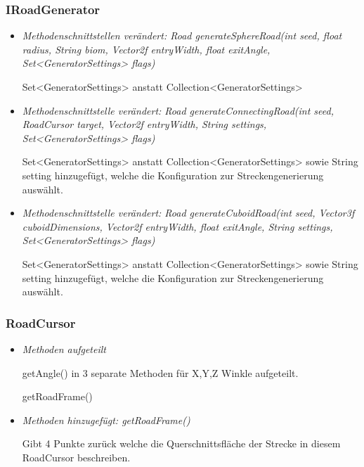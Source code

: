\subsubsection{IRoadGenerator}
\begin{itemize}
    \item \textit{Methodenschnittstellen verändert: Road generateSphereRoad(int seed, float radius, String biom, Vector2f entryWidth, float exitAngle,
    Set<GeneratorSettings> flags)}
        \begin{leftbar}[0.9\linewidth]
            Set<GeneratorSettings> anstatt Collection<GeneratorSettings>\par
        \end{leftbar}
    \item \textit{Methodenschnittstelle verändert: Road generateConnectingRoad(int seed, RoadCursor target, Vector2f entryWidth,
    String settings, Set<GeneratorSettings> flags)}
        \begin{leftbar}[0.9\linewidth]
            Set<GeneratorSettings> anstatt Collection<GeneratorSettings> sowie String setting hinzugefügt,
            welche die Konfiguration zur Streckengenerierung auswählt.\par
        \end{leftbar}
    \item \textit{Methodenschnittstelle verändert: Road generateCuboidRoad(int seed, Vector3f cuboidDimensions, Vector2f entryWidth, float exitAngle,
    String settings, Set<GeneratorSettings> flags)}
        \begin{leftbar}[0.9\linewidth]
            Set<GeneratorSettings> anstatt Collection<GeneratorSettings> sowie String setting hinzugefügt,
            welche die Konfiguration zur Streckengenerierung auswählt.\par
        \end{leftbar}
\end{itemize}

\subsubsection{RoadCursor}
\begin{itemize}
    \item \textit{Methoden aufgeteilt}
        \begin{leftbar}[0.9\linewidth]
            getAngle() in 3 separate Methoden für X,Y,Z Winkle aufgeteilt.\par
        \end{leftbar}getRoadFrame()
    \item \textit{Methoden hinzugefügt: getRoadFrame()}
        \begin{leftbar}[0.9\linewidth]
            Gibt 4 Punkte zurück welche die Querschnittsfläche der Strecke in diesem RoadCursor beschreiben.\par
        \end{leftbar}
\end{itemize}

